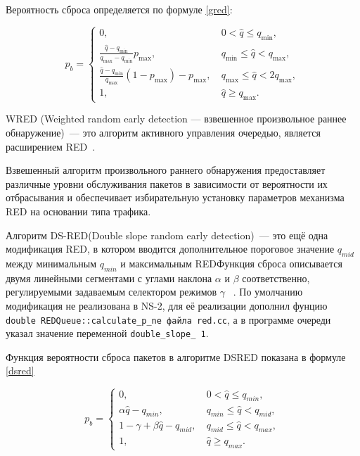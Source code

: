Вероятность сброса определяется по формуле \eqref{gred}:

\begin{equation}
\label{gred}
p_{b} =\begin{cases}
        0, &  \  0 < \hat{q} \leqslant q_{\min}, 
        \\
        \frac{\hat{q} - q_{\min}}{q_{\max} - q_{\min}} p_{\max}, & \ q_{\min} \leqslant \hat{q} < q_{\max}, 
        \\
        \frac{\hat{q} - q_{\min}}{q_{\max}}(1-p_{\max}) - p_{\max}, & \ q_{\max} \leqslant \hat{q} < 2q_{\max}, 
        \\
        1, &  \ \hat{q} \geqslant  q_{\max}.
\end{cases}
\end{equation}


WRED (Weighted random early detection --- взвешенное произвольное раннее
обнаружение)~--- это алгоритм активного управления очередью, является
расширением RED~\cite{WRED}.

Взвешенный алгоритм произвольного раннего обнаружения предоставляет
различные уровни обслуживания пакетов в зависимости от вероятности их
отбрасывания и обеспечивает избирательную установку параметров
механизма RED на основании типа трафика.

Алгоритм DS-RED(Double slope random early detection)~--- это ещё одна модификация RED, в котором вводится дополнительное пороговое значение $q_{mid}$ между минимальным $q_{min}$ и максимальным
REDФункция сброса описывается двумя линейными сегментами с углами наклона $\alpha $ и $\beta $ соответственно, регулируемыми
задаваемым селектором режимов $\gamma$ ~\cite{DSRED}.  По умолчанию модификация не реализована в NS-2, для её реализации дополнил фунцию \verb|double REDQueue::calculate_p_ne файла red.cc|, а в программе очереди указал значение переменной \verb|double_slope_ 1|. 

Функция вероятности сброса пакетов в алгоритме DSRED показана в формуле \eqref{dsred}

\begin{equation}
\label{dsred}
p_{b} =\begin{cases}
        0, &  \  0 < \hat{q} \leqslant q_{min}, 
        \\
        \alpha{\hat{q} - q_{min}}, & \ q_{min} \leqslant \hat{q} < q_{mid}, 
        \\
        1 - \gamma + \beta{\hat{q} - q_{mid}}, & \ q_{mid} \leqslant \hat{q} < q_{max}, 
        \\
        1, &  \ \hat{q} \geqslant  q_{max}.
\end{cases}
\end{equation}

